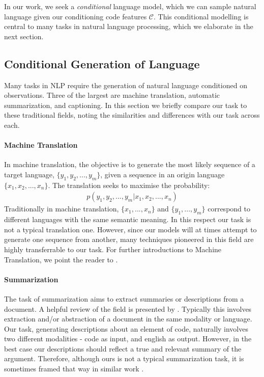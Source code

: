 In our work, we seek a \textit{conditional} language model, which we can sample natural language given our conditioning code features $\mathcal{C}$. This conditional modelling is central to many tasks in natural language processing, which we elaborate in the next section.

\subsection{Conditional Generation of Language}

Many tasks in NLP require the generation of natural language conditioned on observations.
Three of the largest are machine translation, automatic summarization, and captioning.
In this section we briefly compare our task to these traditional fields, noting the similarities and differences with our task across each.

\paragraph{Machine Translation}
In machine translation, the objective is to generate the most likely sequence of a target language, $\{y_1, y_2,..., y_m\}$, given a sequence in an origin language  $\{x_1, x_2,..., x_n\}$. 
The translation seeks to maximise the probability:
\begin{align}
p(y_1, y_2,..., y_m| x_1, x_2,...,x_n ) \nonumber
\end{align}
Traditionally in machine translation, $\{x_1, ..., x_n\}$ and $\{y_1,..., y_m\}$ correspond to different languages with the same semantic meaning. 
In this respect our task is not a typical translation one.
However, since our models will at times attempt to generate one sequence from another, many techniques pioneered in this field are highly transferrable to our task. 
For further introductions to Machine Translation, we point the reader to \cite{trove.nla.gov.au/work/23999611,lopez_statistical_2008}.

\paragraph{Summarization}
The task of summarization aims to extract summaries or descriptions from a document.
A helpful review of the field is presented by \citet{allahyari_text_2017}.
Typically this involves extraction and/or abstraction of a document in the same modality or language.
Our task, generating descriptions about an element of code, naturally involves two different modalities - code as input, and english as output.
However, in the best case our descriptions should reflect a true and relevant summary of the argument.
Therefore, although ours is not a typical summarization task, it is sometimes framed that way in similar work \citep{iyer_summarizing_2016}.

